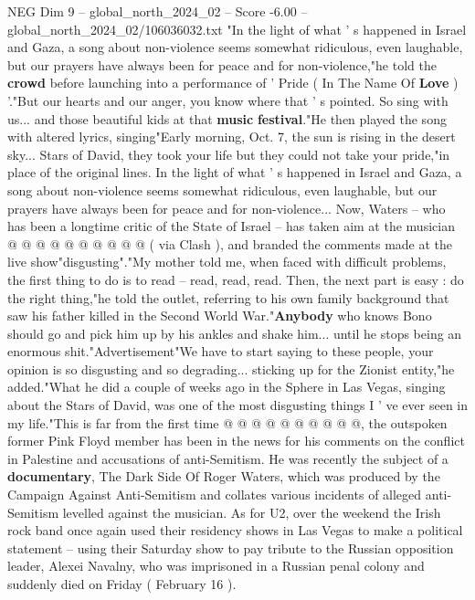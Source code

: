 \begin{textsample}{NEG Dim 9 – global\_north\_2024\_02 – Score -6.00 – global\_north\_2024\_02/106036032.txt}  \label{ex:f9_neg_284}
"In the light of what ' s happened in Israel and Gaza, a song about non-violence seems somewhat ridiculous, even laughable, but our prayers have always been for peace and for non-violence,"he told the \textbf{crowd} before launching into a performance of ' Pride ( In The Name Of \textbf{Love} ) '."But our hearts and our anger, you know where that ' s pointed.
So sing with us... and those beautiful kids at that \textbf{music} \textbf{festival}."He then played the song with altered lyrics, singing"Early morning, Oct. 7, the sun is rising in the desert sky...
Stars of David, they took your life but they could not take your pride,"in place of the original lines.
In the light of what ' s happened in Israel and Gaza, a song about non-violence seems somewhat ridiculous, even laughable, but our prayers have always been for peace and for non-violence...
Now, Waters -- who has been a longtime critic of the State of Israel -- has taken aim at the musician @ @ @ @ @ @ @ @ @ @ ( via Clash ), and branded the comments made at the live show"disgusting"."My mother told me, when faced with difficult problems, the first thing to do is to read -- read, read, read.
Then, the next part is easy : do the right thing,"he told the outlet, referring to his own family background that saw his father killed in the Second World War."\textbf{Anybody} who knows Bono should go and pick him up by his ankles and shake him... until he stops being an enormous shit."Advertisement"We have to start saying to these people, your opinion is so disgusting and so degrading... sticking up for the Zionist entity,"he added."What he did a couple of weeks ago in the Sphere in Las Vegas, singing about the Stars of David, was one of the most disgusting things I ' ve ever seen in my life."This is far from the first time @ @ @ @ @ @ @ @ @ @, the outspoken former Pink Floyd member has been in the news for his comments on the conflict in Palestine and accusations of anti-Semitism.
He was recently the subject of a \textbf{documentary}, The Dark Side Of Roger Waters, which was produced by the Campaign Against Anti-Semitism and collates various incidents of alleged anti-Semitism levelled against the musician.
As for U2, over the weekend the Irish rock band once again used their residency shows in Las Vegas to make a political statement -- using their Saturday show to pay tribute to the Russian opposition leader, Alexei Navalny, who was imprisoned in a Russian penal colony and suddenly died on Friday ( February 16 ).

\end{textsample}
